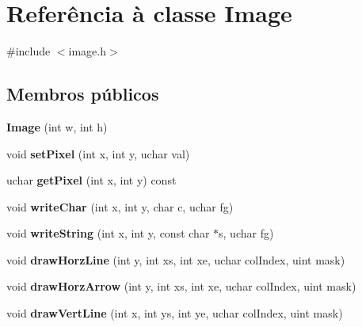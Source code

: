\hypertarget{class_image}{\section{Referência à classe Image}
\label{class_image}
}


{\ttfamily \#include $<$image.\-h$>$}

\subsection*{Membros públicos}
\begin{DoxyCompactItemize}
\item 
\hypertarget{class_image_aa2ab8232143bbfefb6f49fa988b5dc98}{{\bfseries Image} (int w, int h)}\label{class_image_aa2ab8232143bbfefb6f49fa988b5dc98}

\item 
\hypertarget{class_image_a059eb54d99be83c87b3e6c7d22334798}{void {\bfseries set\-Pixel} (int x, int y, uchar val)}\label{class_image_a059eb54d99be83c87b3e6c7d22334798}

\item 
\hypertarget{class_image_a8b62a67325ea7a33a500ed3e30168bbf}{uchar {\bfseries get\-Pixel} (int x, int y) const }\label{class_image_a8b62a67325ea7a33a500ed3e30168bbf}

\item 
\hypertarget{class_image_adc1b18d0881f64884a6a1c3f679e9952}{void {\bfseries write\-Char} (int x, int y, char c, uchar fg)}\label{class_image_adc1b18d0881f64884a6a1c3f679e9952}

\item 
\hypertarget{class_image_aff7a848014d71c7e25598b753ad6a987}{void {\bfseries write\-String} (int x, int y, const char $\ast$s, uchar fg)}\label{class_image_aff7a848014d71c7e25598b753ad6a987}

\item 
\hypertarget{class_image_a45e162d49e410219b919c46033b25959}{void {\bfseries draw\-Horz\-Line} (int y, int xs, int xe, uchar col\-Index, uint mask)}\label{class_image_a45e162d49e410219b919c46033b25959}

\item 
\hypertarget{class_image_a26e4ec981f73670ea3d0843440cd7a69}{void {\bfseries draw\-Horz\-Arrow} (int y, int xs, int xe, uchar col\-Index, uint mask)}\label{class_image_a26e4ec981f73670ea3d0843440cd7a69}

\item 
\hypertarget{class_image_a2b4a57cc4f5a2d59030e627ef3951f6a}{void {\bfseries draw\-Vert\-Line} (int x, int ys, int ye, uchar col\-Index, uint mask)}\label{class_image_a2b4a57cc4f5a2d59030e627ef3951f6a}


\end{DoxyCompactItemize}
